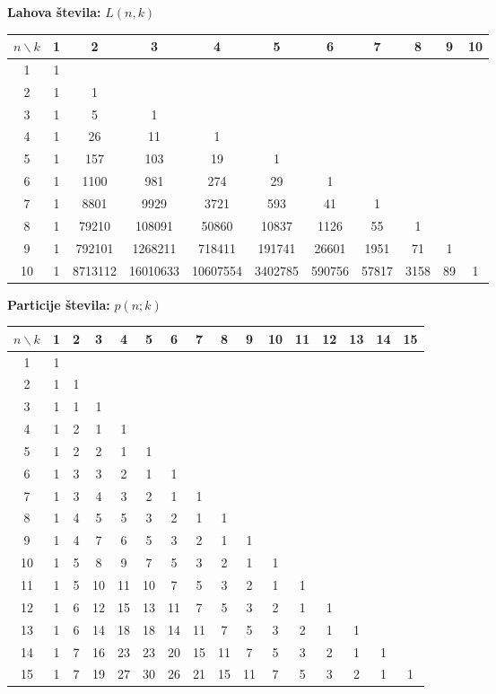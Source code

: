 \documentclass[a4paper, oneside, 10pt]{article}
\theoremstyle{definition}
\begin{document}
{\textbf{Lahova števila:} $L(n, k)$ \\
\begin{tabular}{|*{11}{c|}}
  \hline
  $n \backslash k$ & 1&2&3&4&5&6&7&8&9&10 \\ \hline
  1 & 1 &  &  &  &  &  &  &  &  & \\ \hline
  2 & 1 & 1 &  &  &  &  &  &  &  & \\ \hline
  3 & 1 & 5 & 1 &  &  &  &  &  &  & \\ \hline
  4 & 1 & 26 & 11 & 1 &  &  &  &  &  & \\ \hline
  5 & 1 & 157 & 103 & 19 & 1 &  &  &  &  & \\ \hline
  6 & 1 & 1100 & 981 & 274 & 29 & 1 &  &  &  & \\ \hline
  7 & 1 & 8801 & 9929 & 3721 & 593 & 41 & 1 &  &  & \\ \hline
  8 & 1 & 79210 & 108091 & 50860 & 10837 & 1126 & 55 & 1 &  & \\ \hline
  9 & 1 & 792101 & 1268211 & 718411 & 191741 & 26601 & 1951 & 71 & 1 & \\ \hline
  10 & 1 & 8713112 & 16010633 & 10607554 & 3402785 & 590756 & 57817 & 3158 & 89 & 1\\ \hline
\end{tabular}

\textbf{Particije števila:} $p(n; k)$ \\
\begin{tabular}{|*{16}{c|}}
  \hline
  $n \backslash k$ & 1&2&3&4&5&6&7&8&9&10&11&12&13&14&15 \\ \hline
  1 & 1 &  &  &  &  &  &  &  &  &  &  &  &  &  & \\ \hline
  2 & 1 & 1 &  &  &  &  &  &  &  &  &  &  &  &  & \\ \hline
  3 & 1 & 1 & 1 &  &  &  &  &  &  &  &  &  &  &  & \\ \hline
  4 & 1 & 2 & 1 & 1 &  &  &  &  &  &  &  &  &  &  & \\ \hline
  5 & 1 & 2 & 2 & 1 & 1 &  &  &  &  &  &  &  &  &  & \\ \hline
  6 & 1 & 3 & 3 & 2 & 1 & 1 &  &  &  &  &  &  &  &  & \\ \hline
  7 & 1 & 3 & 4 & 3 & 2 & 1 & 1 &  &  &  &  &  &  &  & \\ \hline
  8 & 1 & 4 & 5 & 5 & 3 & 2 & 1 & 1 &  &  &  &  &  &  & \\ \hline
  9 & 1 & 4 & 7 & 6 & 5 & 3 & 2 & 1 & 1 &  &  &  &  &  & \\ \hline
  10 & 1 & 5 & 8 & 9 & 7 & 5 & 3 & 2 & 1 & 1 &  &  &  &  & \\ \hline
  11 & 1 & 5 & 10 & 11 & 10 & 7 & 5 & 3 & 2 & 1 & 1 &  &  &  & \\ \hline
  12 & 1 & 6 & 12 & 15 & 13 & 11 & 7 & 5 & 3 & 2 & 1 & 1 &  &  & \\ \hline
  13 & 1 & 6 & 14 & 18 & 18 & 14 & 11 & 7 & 5 & 3 & 2 & 1 & 1 &  & \\ \hline
  14 & 1 & 7 & 16 & 23 & 23 & 20 & 15 & 11 & 7 & 5 & 3 & 2 & 1 & 1 & \\ \hline
  15 & 1 & 7 & 19 & 27 & 30 & 26 & 21 & 15 & 11 & 7 & 5 & 3 & 2 & 1 & 1\\ \hline
\end{tabular}

}
\end{document}
